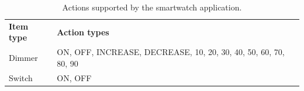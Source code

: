 \begin{table}[]
\centering
\caption{Actions supported by the smartwatch application.}
\label{tbl:design:communication-with-openhab:supported-types}
\begin{tabular}{p{2cm}p{11cm}}
\textbf{Item type}      & \textbf{Action types}                      \\ 
Dimmer                  & ON, OFF, INCREASE, DECREASE, 10, 20, 30, 40, 50, 60, 70, 80, 90           \\
Switch                  & ON, OFF                                     
\end{tabular}
\end{table}

